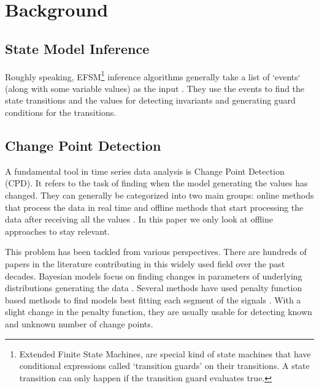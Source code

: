\section{Background}
\subsection{State Model Inference}
Roughly speaking, EFSM\footnote{Extended Finite State Machines, are special kind of state machines that have conditional expressions called `transition guards' on their transitions. A state transition can only happen if the transition guard evaluates true.} inference algorithms generally take a list of `events` (along with some variable values) as the input \cite{walkinshaw2016inferring}. They use the events to find the state transitions and the values for detecting invariants and generating guard  conditions for the transitions. 

\subsection{Change Point Detection}
A fundamental tool in time series data analysis is Change Point Detection (CPD). It refers to the task of finding when the model generating the values has changed. 
They can generally be categorized into two main groups: online methods that process the data in real time and offline methods that start processing the data after receiving all the values  \cite{Truong2018ChangePointSurvey}. 
In this paper we only look at offline approaches to stay relevant.


This problem has been tackled from various perspectives. There are hundreds of papers in the literature contributing in this widely used field over the past decades. \cite{chen2011parametric, hasan2014information, hsu1982bayesian, lee2017implicit, oh2002analyzing, ramos2016anomalies, reeves2007review, rosenfield2010change, wang2011non, xie2013sequential, yamanishi2004line, Lavielle1999} Bayesian models focus on finding changes in parameters of underlying distributions generating the data \cite{Lee2018TimeSeriesSegmentation, adams2007bayesian, bai1997estimation, barry1993bayesian, erdman2008fast, ray2002bayesian}. Several methods have used penalty function based methods to find models best fitting each segment of the signals \cite{Lavielle1999, lavielle2005using, keshavarz2018optimal, pein2017heterogeneous}. With a slight change in the penalty function, they are usually usable for detecting known and unknown number of change points. 

